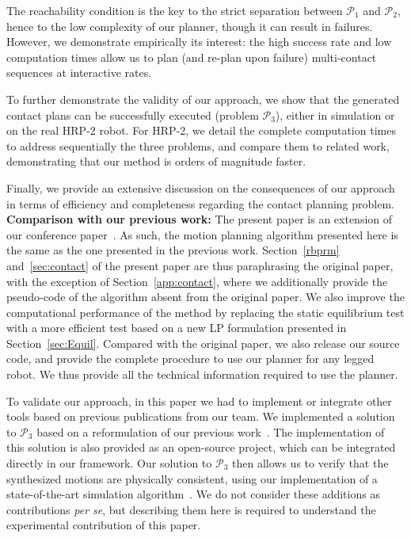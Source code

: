The reachability condition is the key to the strict separation between $\mathcal{P}_1$ and $\mathcal{P}_2$, hence to the low complexity of our planner, though it
can result in failures. However, we demonstrate empirically its interest: the high success rate and low computation times allow us to plan (and re-plan upon failure) multi-contact sequences at \gls{interactive} rates.

To further demonstrate the validity of our approach, we show that the generated contact plans  can be successfully executed (problem  $\mathcal{P}_3$), either in simulation or on the real HRP-2 robot. For HRP-2, we detail the complete computation times to address sequentially the three problems, and compare them to related work, demonstrating that our method is orders of magnitude faster.

Finally, we provide an extensive discussion on the consequences of our approach in terms of efficiency and completeness regarding the contact planning problem. \\

\noindent \textbf{Comparison with our previous work:}
The present paper is an extension of our conference paper~\cite{tonneauisrr15}. As such, the motion planning algorithm presented here is the same as the one presented in the
previous work. Section~\ref{rbprm} and~\ref{sec:contact} of the present paper are thus paraphrasing the original paper, with the exception of Section~\ref{app:contact}, where we additionally provide the pseudo-code of the algorithm absent from the original paper. We also improve the computational performance of the method by replacing the static equilibrium test with a more efficient test based on a new LP formulation presented in Section~\ref{sec:Equil}.
Compared with the original paper, we also release our source code, and provide the complete procedure to use our planner for any legged robot. We thus provide
all the technical information required to use the planner.

To validate our approach, in this paper we had to implement or integrate other tools based on previous publications from our team. We implemented a solution to $\mathcal{P}_3$ based on a reformulation of our previous work~\cite{Carpentier2016}. The implementation of this solution is also provided as an open-source project, which can be integrated directly in our framework. Our solution to $\mathcal{P}_3$ then allows us to verify that the synthesized motions are physically consistent, using our implementation of a state-of-the-art simulation algorithm~\cite{Kaufman2008}.
We do not consider these additions as contributions \textit{per se}, but describing them here is required to understand the experimental contribution of this paper.

